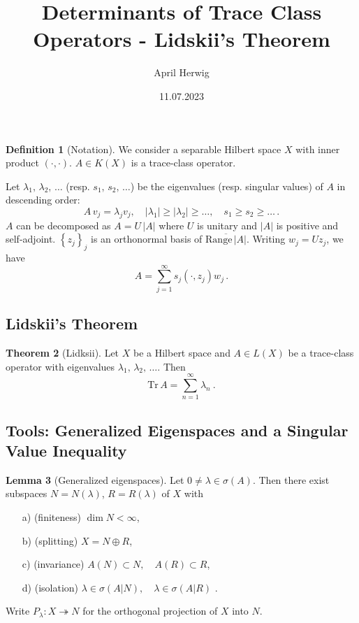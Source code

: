 \documentclass[a4paper]{article}
\title{\vspace*{-5ex}Determinants of Trace Class Operators - Lidskii's Theorem}
\author{\vspace*{-15ex}April Herwig}
\date{11.07.2023}
\newcommand{\Tr}{\textrm{Tr}\,}
\newcommand{\ran}{\textrm{Range}\,}
\theoremstyle{definition}
\newtheorem{definition}{Definition}[section]
\newtheorem{theorem}[definition]{Theorem}
\newtheorem{lemma}[definition]{Lemma}
\theoremstyle{remark}
\theoremstyle{remark}
\begin{document}
\maketitle

\begin{definition}[Notation]
    We consider a separable Hilbert space $X$ with inner product $(\cdot, \cdot)$. $A \in K(X)$ is a trace-class operator. 

    Let $\lambda_1,\, \lambda_2,\, \ldots$ (resp. $s_1,\, s_2,\, \ldots$) be the eigenvalues (resp. singular values) of $A$ in descending order:
    \begin{equation}
        A\, v_j = \lambda_j v_j, \quad |\lambda_1| \geq |\lambda_2| \geq \ldots, \quad s_1 \geq s_2 \geq \ldots\, .
    \end{equation}
    $A$ can be decomposed as $A = U\, |A|$ where $U$ is unitary and $|A|$ is positive and self-adjoint. $\left\{ z_j \right\}_j$ is an orthonormal basis of $\overline{\ran |A|}$. Writing $w_j = U z_j$, we have
    \begin{equation}
        A = \sum_{j=1}^\infty s_j (\cdot, z_j) w_j \,. 
    \end{equation}
\end{definition}

\subsection{Lidskii's Theorem}

\begin{theorem}[Lidksii]
    \label{lidskii}
    Let $X$ be a Hilbert space and $A \in L(X)$ be a trace-class operator with eigenvalues $\lambda_1,\, \lambda_2,\, \ldots$. Then 
    \begin{equation}
        \Tr A = \sum_{n=1}^{\infty} \lambda_n\ . 
    \end{equation}
\end{theorem}

\subsection{Tools: Generalized Eigenspaces and a Singular Value Inequality}

\begin{lemma}[Generalized eigenspaces]
    Let $0 \neq \lambda \in \sigma (A)$. Then there exist subspaces $N = N(\lambda)$, $R = R(\lambda)$ of $X$ with
    \begin{enumerate}
        \item[a)] (finiteness) $\dim N < \infty$,
        \item[b)] (splitting) $X = N \oplus R$,
        \item[c)] (invariance) $A(N) \subset N,\quad A(R) \subset R$,
        \item[d)] (isolation) $\lambda \in \sigma (A \vert N),\quad \lambda \in \sigma (A \vert R)$ . 
    \end{enumerate}
    Write $P_\lambda : X \twoheadrightarrow N$ for the orthogonal projection of $X$ into $N$. 
\end{lemma}
\end{document}
